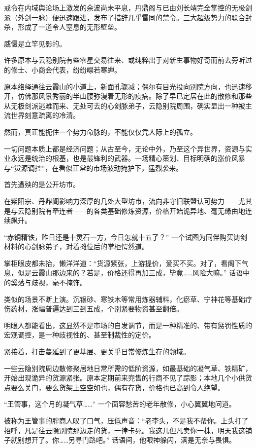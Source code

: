 戒令在内域舆论场上激发的余波尚未平息，丹鼎阁与已由刘长靖完全掌控的无极剑派（外剑一脉）便迅速跟进，发布了措辞几乎雷同的禁令。三大超级势力的联合封杀，形成了一道令人窒息的无形壁垒。

威慑是立竿见影的。

许多原本与云隐别院有些零星交易往来、或纯粹出于对新生事物好奇而前去旁听过的修士、小商会代表，纷纷噤若寒蝉。

原本络绎通往云霞山的小道上，新面孔骤减；偶尔有目光投向别院方向，也迅速移开，仿佛那风景秀丽的半山腰弥漫着无形的疫病。除了早已定居在此的散修和那些从无极剑派逃难而来、无处可去的心剑脉弟子，云隐别院周围，确实显出一种被主流世界刻意疏离的冷清。

\vspace{2em}

然而，真正能扼住一个势力命脉的，不能仅仅凭人际上的孤立。

一切问题本质上都是经济问题；从古至今，无论中外，乃至这个异世界，资源与实业永远是统治的根基，也是最锋利的武器。一场精心策划、目标明确的涨价风暴与“货源调控”，在看似正常的市场波动掩护下，猛烈袭来。

首先遭殃的是公开坊市。

在紫阳宗、丹鼎阁影响力深厚的几处大型坊市，流向非守旧联盟认可势力——尤其是与云隐别院有牵连者——的各类基础修炼资源，价格开始诡异地、毫无缘由地连续飙升。

“赤铜精铁，昨日还是十灵石一方，今日怎就十五了？” 一个试图为同伴购买铸剑材料的心剑脉弟子，对着摊位后的掌柜愕然道。

掌柜眼皮都未抬，懒洋洋道：“货源紧张，上游提价，爱买不买。对了，看阁下气息，似是云霞山那边来的？若是，价格还得再加三成，毕竟……风险大嘛。” 话语中的奚落与歧视，毫不掩饰。

类似的场景不断上演。沉银砂、寒铁木等常用炼器辅料，化瘀草、宁神花等基础疗伤药材，涨幅普遍达到三到五成，个别紧要物资甚至翻倍。

明眼人都能看出，这显然不是市场的自发调节，而是一种精准的、带有惩罚性质的宏观调控，是一种歧视性的、甚至制裁性的定价。

紧接着，打击蔓延到了更基层、更关乎日常修炼生存的领域。

一些云隐别院周边散修聚居地日常所需的低阶资源，如最基础的凝气草、铁精矿，开始出现诡异的货源紧张。原本定期前来兜售的行商不见了踪影；本地几个小供货点要么关门，要么货架上空空如也，偶有存货，价格也已高到令人绝望。

“王管事，这个月的凝气草……” 一个面容愁苦的老年散修，小心翼翼地问道。

被称为王管事的胖商人叹了口气，压低声音：“老李头，不是我不帮你。上头打了招呼，凡是往云隐别院那边走的货，一律卡死。我这儿但凡卖你一株，明天我这铺子就别想开了。你……另寻门路吧。” 话语间，他眼神躲闪，满是无奈与畏惧。

